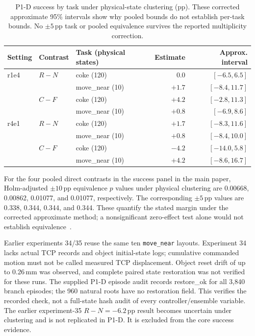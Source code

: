 \begin{table}[ht]
\centering\small
\caption{P1-D success by task under physical-state clustering (pp). These corrected approximate 95\% intervals show why pooled bounds do not establish per-task bounds. No $\pm5$\,pp task or pooled equivalence survives the reported multiplicity correction.}
\label{tab:spatialtasks}
\begin{tabular}{@{}lllrr@{}}\toprule
Setting & Contrast & Task (physical states) & Estimate & Approx. interval\\\midrule
r1e4 & $R-N$ & coke (120) & 0.0 & $[-6.5,6.5]$\\
 & & move\_near (10) & $+1.7$ & $[-8.4,11.7]$\\
 & $C-F$ & coke (120) & $+4.2$ & $[-2.8,11.3]$\\
 & & move\_near (10) & $+0.8$ & $[-6.9,8.6]$\\
r4e1 & $R-N$ & coke (120) & $+1.7$ & $[-8.3,11.6]$\\
 & & move\_near (10) & $+0.8$ & $[-8.4,10.0]$\\
 & $C-F$ & coke (120) & $-4.2$ & $[-14.0,5.8]$\\
 & & move\_near (10) & $+4.2$ & $[-8.6,16.7]$\\\bottomrule
\end{tabular}
\end{table}

For the four pooled direct contrasts in the success panel in the main paper, Holm-adjusted $\pm10$\,pp equivalence $p$ values under physical clustering are 0.00668, 0.00862, 0.01077, and 0.01077, respectively. The corresponding $\pm5$\,pp values are 0.338, 0.344, 0.344, and 0.344. These quantify the stated margin under the corrected approximate method; a nonsignificant zero-effect test alone would not establish equivalence~\citep{lakens2017equivalence}.

Earlier experiments 34/35 reuse the same ten \texttt{move\_near} layouts. Experiment 34 lacks actual TCP records and object initial-state logs; cumulative commanded motion must not be called measured TCP displacement. Object reset drift of up to 0.26\,mm was observed, and complete paired state restoration was not verified for these runs. The supplied P1-D episode audit records restore\_ok for all 3,840 branch episodes; the 960 natural roots have no restoration field. This verifies the recorded check, not a full-state hash audit of every controller/ensemble variable. The earlier experiment-35 $R-N=-6.2$\,pp result becomes uncertain under clustering and is not replicated in P1-D. It is excluded from the core success evidence.

